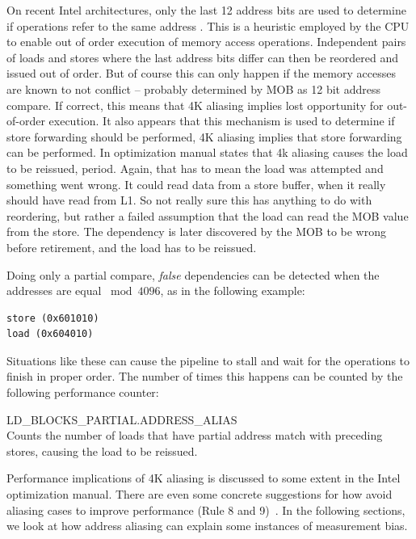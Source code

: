 \documentclass[a4paper,10pt,twocolumn,twoside]{article}
\begin{document}
On recent Intel architectures, only the last 12 address bits are used to determine if operations refer to the same address \cite{Intel:2012:OptimizationManual}.
This is a heuristic employed by the CPU to enable out of order execution of memory access operations.
Independent pairs of loads and stores where the last address bits differ can then be reordered and issued out of order.
But of course this can only happen if the memory accesses are known to not conflict -- probably determined by MOB as 12 bit address compare.
If correct, this means that 4K aliasing implies lost opportunity for out-of-order execution.
It also appears that this mechanism is used to determine if store forwarding should be performed, 4K aliasing implies that store forwarding can be performed.
In optimization manual states that 4k aliasing causes the load to be reissued, period.
Again, that has to mean the load was attempted and something went wrong.
It could read data from a store buffer, when it really should have read from L1. 
So not really sure this has anything to do with reordering, but rather a failed assumption that the load can read the MOB value from the store. 
The dependency is later discovered by the MOB to be wrong before retirement, and the load has to be reissued.

Doing only a partial compare, \emph{false} dependencies can be detected when the addresses are equal $\bmod 4096$, as in the following example: 
\begin{lstlisting}
store (0x601010)
load (0x604010)
\end{lstlisting}
Situations like these can cause the pipeline to stall and wait for the operations to finish in proper order.
The number of times this happens can be counted by the following performance counter:
\begin{description}
  \item{LD\_BLOCKS\_PARTIAL.ADDRESS\_ALIAS} \hfill \\
  Counts the number of loads that have partial address match with preceding stores, causing the load to be reissued.
\end{description}
Performance implications of 4K aliasing is discussed to some extent in the Intel optimization manual. 
There are even some concrete suggestions for how avoid aliasing cases to improve performance (Rule 8 and 9)~\cite{Intel:2012:OptimizationManual}.
In the following sections, we look at how address aliasing can explain some instances of measurement bias.
\end{document}
